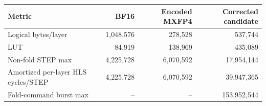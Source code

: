\begin{tabular}{lrrr}
\toprule
Metric & BF16 & Encoded MXFP4 & Corrected candidate \\
\midrule
Logical bytes/layer & 1{,}048{,}576 & 278{,}528 & 537{,}744 \\
LUT & 84{,}919 & 138{,}969 & 435{,}089 \\
Non-fold STEP max & 4{,}225{,}728 & 6{,}070{,}592 & 17{,}954{,}144 \\
Amortized per-layer HLS cycles/STEP & 4{,}225{,}728 & 6{,}070{,}592 & 39{,}947{,}365 \\
Fold-command burst max & -- & -- & 153{,}952{,}544 \\
\bottomrule
\end{tabular}
